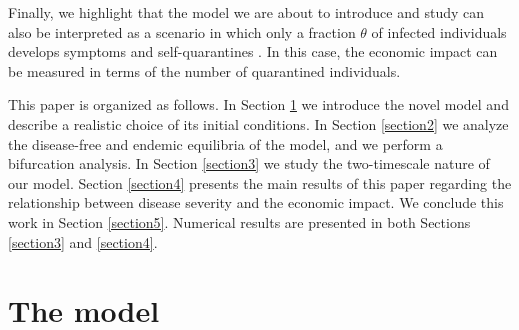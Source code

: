 \documentclass[11pt,reqno]{amsart}
\theoremstyle{boldremark}
\begin{document}
Finally, we highlight that the model we are about to introduce and study can also be interpreted as a scenario in which only a fraction $\theta$ of infected individuals develops symptoms and self-quarantines \cite{10418977,32,30,31,29,33}. In this case, the economic impact can be measured in terms of the number of quarantined individuals.

This paper is organized as follows. In Section \ref{section1} we introduce the novel model and describe a realistic choice of its initial conditions. In Section \ref{section2} we analyze the disease-free and endemic equilibria of the model, and we perform a bifurcation analysis. In Section \ref{section3} we study the two-timescale nature of our model. Section \ref{section4} presents the main results of this paper regarding the relationship between disease severity and the economic impact. We conclude this work in Section \ref{section5}. Numerical results are presented in both Sections \ref{section3} and \ref{section4}. 
	
\section{The model} \label{section1}
\end{document}
